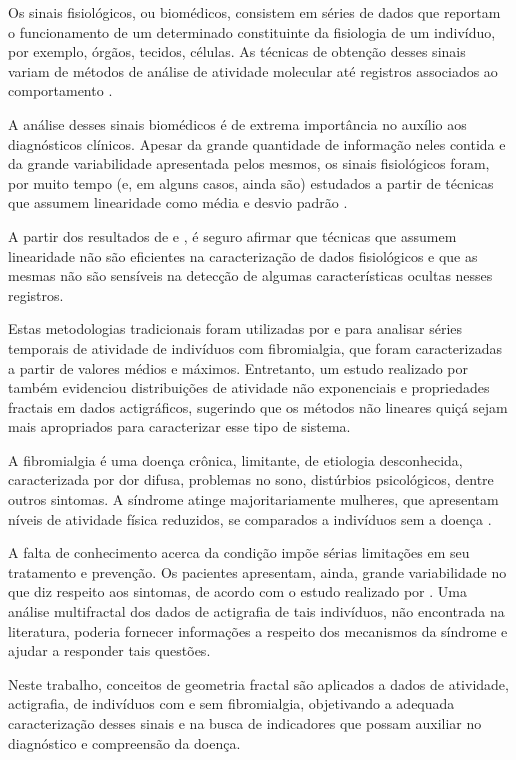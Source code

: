 \documentclass{ufscThesis}
\begin{document}
Os sinais fisiológicos, ou biomédicos, consistem em séries de dados que reportam o funcionamento de um determinado constituinte da fisiologia de um indivíduo, por exemplo, órgãos, tecidos, células. As técnicas de obtenção desses sinais variam de métodos de análise de atividade molecular até registros associados ao comportamento \cite{The1978}. \par
A análise desses sinais biomédicos é de extrema importância no auxílio aos diagnósticos clínicos. Apesar da grande quantidade de informação neles contida e da grande variabilidade apresentada pelos mesmos, os sinais fisiológicos foram, por muito tempo (e, em alguns casos, ainda são) estudados a partir de técnicas que assumem linearidade como média e desvio padrão \cite{Goldberger2000}. \par
A partir dos resultados de  e , é seguro afirmar que técnicas que assumem linearidade não são eficientes na caracterização de dados fisiológicos e que as mesmas não são sensíveis na detecção de algumas características ocultas nesses registros.\par
Estas metodologias tradicionais foram utilizadas por  e  para analisar séries temporais de atividade de indivíduos com fibromialgia, que foram caracterizadas a partir de valores médios e máximos. Entretanto, um estudo realizado por  também evidenciou distribuições de atividade não exponenciais e propriedades fractais em dados actigráficos, sugerindo que os métodos não lineares quiçá sejam mais apropriados para caracterizar esse tipo de sistema.\par
A fibromialgia é uma doença crônica, limitante, de etiologia desconhecida, caracterizada por dor difusa, problemas no sono, distúrbios psicológicos, dentre outros sintomas. A síndrome atinge majoritariamente mulheres, que apresentam níveis de atividade física reduzidos, se comparados a indivíduos sem a doença \cite{Bellato2012,McLoughlin2011}. \par
A falta de conhecimento acerca da condição impõe sérias limitações em seu tratamento e prevenção. Os pacientes apresentam, ainda, grande variabilidade no que diz respeito aos sintomas, de acordo com o estudo realizado por . Uma análise multifractal dos dados de actigrafia de tais indivíduos, não encontrada na literatura, poderia fornecer informações a respeito dos mecanismos da síndrome e ajudar a responder tais questões.\par
Neste trabalho, conceitos de geometria fractal são aplicados a dados de atividade, actigrafia, de indivíduos com e sem fibromialgia, objetivando a adequada caracterização desses sinais e na busca de indicadores que possam auxiliar no diagnóstico e compreensão da doença.
\end{document}
